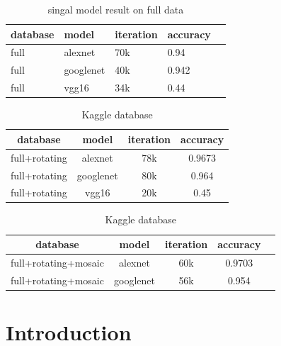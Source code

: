 \documentclass[conference]{IEEEtran}
\begin{document}
\begin{table}[t]
  \caption{singal model result on full data}
  \label{table2}
  \centering
  \begin{tabular}{lllll}
    \toprule
    \cmidrule{1-2}
    database     &model     &iteration   &accuracy \\
    \midrule
    full & alexnet  & 70k  & 0.94 \\
    full & googlenet &40k  &0.942 \\
    full  & vgg16 & 34k & 0.44 \\
    \bottomrule
  \end{tabular}
\end{table}


\begin{table}[!ht]
\small
\centering
\caption{Kaggle database}
\begin{tabular}{|c|c|c|c|}
\hline  database     &model     &iteration   &accuracy \\
\hline full+rotating & alexnet   & 78k  & 0.9673  \\
\hline full+rotating & googlenet & 80k  &0.964    \\
\hline full+rotating  & vgg16 & 20k & 0.45  \\
\hline
\end{tabular}
\end{table}

\begin{table}[!ht]
\small
\centering
\caption{Kaggle database}
\begin{tabular}{|c|c|c|c|c|}
\hline  database     &model     &iteration   &accuracy \\
\hline full+rotating+mosaic & alexnet   & 60k  & 0.9703  \\
\hline full+rotating+mosaic & googlenet & 56k  &0.954    \\
\hline
\end{tabular}
\end{table}


\section{Introduction}

\end{document}
